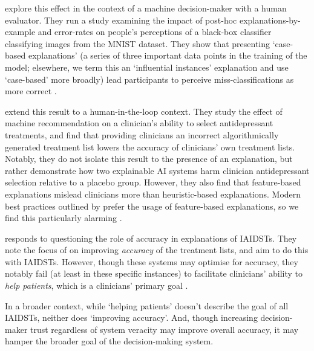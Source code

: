 \textcite{ford_play_2020} explore this effect in the context of a machine decision-maker with a human evaluator. They run a study examining the impact of post-hoc explanations-by-example and error-rates on people's perceptions of a black-box classifier classifying images from the MNIST dataset. They show that presenting `case-based explanations' (a series of three important data points in the training of the model; elsewhere, we term this an `influential instances' explanation and use `case-based' more broadly) lead participants to perceive miss-classifications as more correct \cite{ford_play_2020}.

\textcite{jacobs_how_2021} extend this result to a human-in-the-loop context. They study the effect of machine recommendation on a clinician's ability to select antidepressant treatments, and find that providing clinicians an incorrect algorithmically generated treatment list lowers the accuracy of clinicians' own treatment lists. Notably, they do not isolate this result to the presence of an explanation, but rather demonstrate how two explainable AI systems harm clinician antidepressant selection relative to a placebo group. However, they also find that feature-based explanations mislead clinicians more than heuristic-based explanations. Modern best practices outlined by \textcite{miller_explanation_2017-1} prefer the usage of feature-based explanations, so we find this particularly alarming \cite{jacobs_how_2021}.

\textcite{mccradden_when_2021} responds to \textcite{jacobs_how_2021} questioning the role of accuracy in explanations of IAIDSTs. They note the focus of \textcite{jacobs_how_2021} on improving \emph{accuracy} of the treatment lists, and aim to do this with IAIDSTs. However, though these systems may optimise for accuracy, they notably fail (at least in these specific instances) to facilitate clinicians' ability to \emph{help patients}, which is a clinicians' primary goal \cite{mccradden_when_2021}.

In a broader context, while `helping patients' doesn't describe the goal of all IAIDSTs, neither does `improving accuracy'. And, though increasing decision-maker trust regardless of system veracity may improve overall accuracy, it may hamper the broader goal of the decision-making system.

